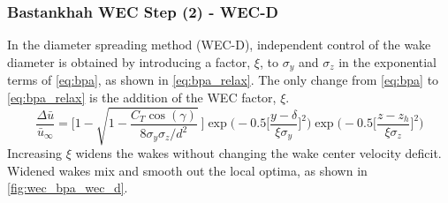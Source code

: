 \documentclass{jpconf}
\begin{document}
\subsubsection{Bastankhah WEC Step (2) - WEC-D}
In the diameter spreading method (WEC-D), independent control of the wake diameter is obtained by introducing a factor, $\xi$, to $\sigma_y$ and $\sigma_z$ in the exponential terms of \cref{eq:bpa}, as shown in \cref{eq:bpa_relax}. The only change from \cref{eq:bpa} to \cref{eq:bpa_relax} is the addition of the WEC factor, $\xi$.
\begin{equation}
	\frac{\Delta \bar{u}}{\bar{u}_{\infty}} = \Bigg[1-\sqrt{1-\frac{C_T \cos{(\gamma)}}{8 \sigma_y \sigma_z/d^2}}~\Bigg] \exp{\bigg(-0.5\Big[\frac{y-\delta}{\xi \sigma_y}\Big]^2\bigg)}\exp{\bigg(-0.5\Big[\frac{z-z_h}{\xi \sigma_z}\Big]^2\bigg)}
	\label{eq:bpa_relax}
\end{equation}
Increasing $\xi$ widens the wakes without changing the wake center velocity deficit. Widened wakes mix and smooth out the local optima, as shown in \cref{fig:wec_bpa_wec_d}. 
%
\end{document}
